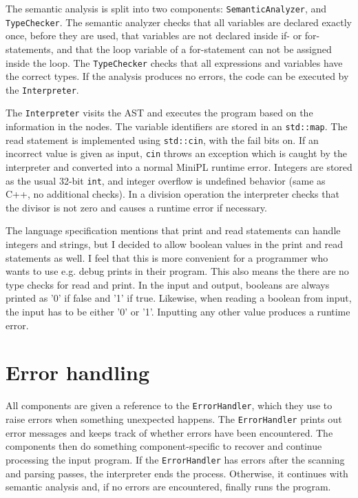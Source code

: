 \documentclass[a4paper]{article}
\newcommand*{\code}[1]{\texttt{#1}}
\begin{document}
The semantic analysis is split into 
two components: \code{SemanticAnalyzer}, and \code{TypeChecker}.
The semantic analyzer checks that all variables are declared 
exactly once, before they are used, that variables are not 
declared inside if- or for-statements, and that 
the loop variable of a for-statement can not be assigned 
inside the loop. The \code{TypeChecker} checks that all expressions
and variables have the correct types. If the 
analysis produces no errors, the code can be executed by the 
\code{Interpreter}.

The \code{Interpreter} visits the AST and executes the 
program based on the information in the nodes. The 
variable identifiers are stored in an \code{std::map}.
The read statement is implemented 
using \code{std::cin}, with the fail bits on. If an 
incorrect value is given as input, \code{cin} throws an 
exception which is caught by the interpreter and converted 
into a normal MiniPL runtime error.
Integers are stored as the usual 32-bit \code{int}, and 
integer overflow is undefined behavior (same as C++, no 
additional checks).
In a division operation the interpreter checks that the 
divisor is not zero and causes a runtime error if necessary.


The language specification mentions that print and read 
statements can handle integers and strings, but
I decided to allow boolean values in the print and read 
statements as well. I feel that this is more convenient for 
a programmer who wants to use e.g. debug prints in their 
program.  This also means the there are no type checks 
for read and print. 
In the input and output, booleans are always printed as 
'0' if false and '1' 
if true. Likewise, when reading a boolean from input, the 
input has to be either '0' or '1'. Inputting any other value 
produces a runtime error.



\section{Error handling}
\label{sect:errors}

All components are given a reference to the \code{ErrorHandler}, 
which they use to raise errors when something unexpected happens.
The \code{ErrorHandler} prints out error messages and keeps track 
of whether errors have been encountered. 
The components then do something component-specific to recover and 
continue processing the input program. If the \code{ErrorHandler} 
has errors after the scanning and parsing passes, the interpreter 
ends the process. Otherwise, it continues with semantic analysis 
and, if no errors are encountered, finally runs the program.
\end{document}
